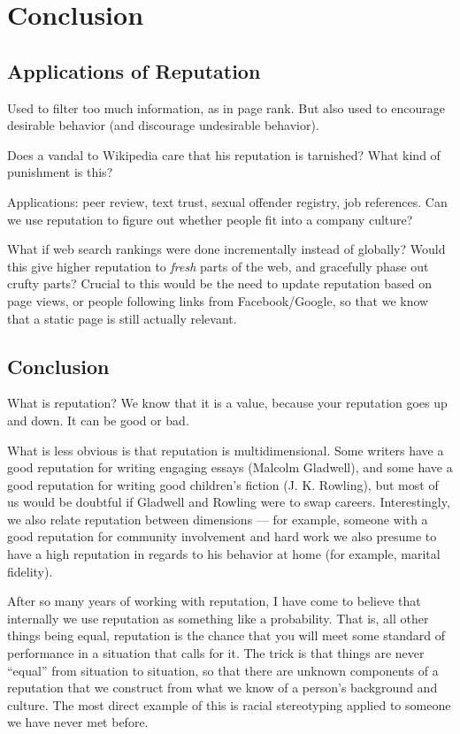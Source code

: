 \section{Conclusion}

\subsection{Applications of Reputation}

Used to filter too much information, as in page rank.
But also used to encourage desirable behavior
(and discourage undesirable behavior).

Does a vandal to Wikipedia care that his reputation is
tarnished?  What kind of punishment is this?

Applications: peer review, text trust, sexual offender registry, job references.
Can we use reputation to figure out whether people
fit into a company culture?

What if web search rankings were done incrementally
instead of globally?  Would this give higher reputation
to \textit{fresh} parts of the web, and gracefully
phase out crufty parts?  Crucial to this would be the
need to update reputation based on page views, or
people following links from Facebook/Google, so that
we know that a static page is still actually relevant.


\subsection{Conclusion}

What is reputation?  We know that it is a value, because your reputation goes
up and down. It can be good or bad.

What is less obvious is that reputation is multidimensional.  Some writers have
a good reputation for writing engaging essays (\eg Malcolm Gladwell), and some
have a good reputation for writing good children's fiction (\eg J. K. Rowling),
but most of us would be doubtful if Gladwell and Rowling were to swap careers.
Interestingly, we also relate reputation between
dimensions --- for example, someone
with a good reputation for community involvement and hard work we also presume
to have a high reputation in regards to his behavior at home (for example,
marital fidelity).

After so many years of working with reputation, I have come to believe that
internally we use reputation as something like a probability. That is, all
other things being equal, reputation is the chance that you will meet some
standard of performance in a situation that calls for it.  The trick is that
things are never ``equal'' from situation to situation, so that there are
unknown components of a reputation that we construct from what
we know of a person's background and culture.
The most direct example of this is racial stereotyping applied to
someone we have never met before.

